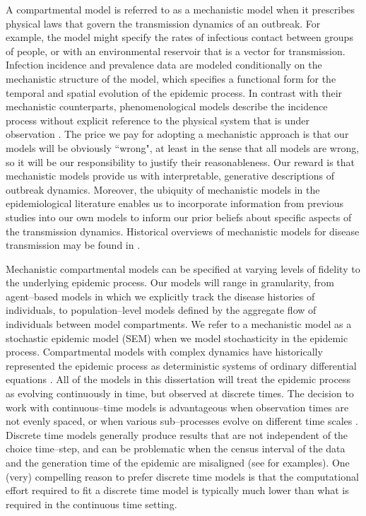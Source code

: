 A compartmental model is referred to as a mechanistic model when it prescribes physical laws that govern the transmission dynamics of an outbreak. For example, the model might specify the rates of infectious contact between groups of people, or with an environmental reservoir that is a vector for transmission. Infection incidence and prevalence data are modeled conditionally on the mechanistic structure of the model, which specifies a functional form for the temporal and spatial evolution of the epidemic process. In contrast with their mechanistic counterparts, phenomenological models describe the incidence process without explicit reference to the physical system that is under observation \cite{chowell2016review,chowell2017fitting}. The price we pay for adopting a mechanistic approach is that our models will be obviously ``wrong", at least in the sense that all models are wrong, so it will be our responsibility to justify their reasonableness. Our reward is that mechanistic models provide us with interpretable, generative descriptions of outbreak dynamics. Moreover, the ubiquity of mechanistic models in the epidemiological literature enables us to incorporate information from previous studies into our own models to inform our prior beliefs about specific aspects of the transmission dynamics. Historical overviews of mechanistic models for disease transmission may be found in \cite{anderson1992infectious,brauer2017mathematical,keeling2008,lessler2016mechanistic}.

Mechanistic compartmental models can be specified at varying levels of fidelity to the underlying epidemic process. Our models will range in granularity, from agent--based models in which we explicitly track the disease histories of individuals, to population--level models defined by the aggregate flow of individuals between model compartments. We refer to a mechanistic model as a stochastic epidemic model (SEM) when we model stochasticity in the epidemic process. Compartmental models with complex dynamics have historically represented the epidemic process as deterministic systems of ordinary differential equations \cite{keeling2008}. All of the models in this dissertation will treat the epidemic process as evolving continuously in time, but observed at discrete times. The decision to work with continuous--time models is advantageous when observation times are not evenly spaced, or when various sub--processes evolve on different time scales \cite{glass2003,shelton2014}. Discrete time models generally produce results that are not independent of the choice time--step, and can be problematic when the census interval of the data and the generation time of the epidemic are misaligned (see \cite{shelton2014} for examples). One (very) compelling reason to prefer discrete time models is that the computational effort required to fit a discrete time model is typically much lower than what is required in the continuous time setting. 

